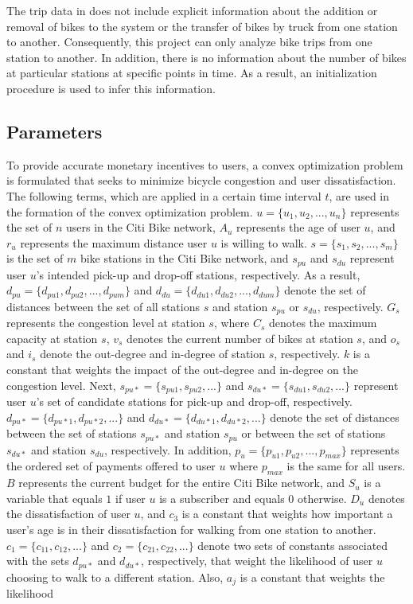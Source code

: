 \documentclass[times, 10pt,twocolumn]{article}
\begin{document}
The trip data in \cite{dataset} does not include explicit information about the addition or removal of bikes to the system or the transfer of bikes by truck from one station to another. Consequently, this project can only analyze bike trips from one station to another. In addition, there is no information about the number of bikes at particular stations at specific points in time. As a result, an initialization procedure is used to infer this information. 

\subsection{Parameters}

To provide accurate monetary incentives to users, a convex optimization problem is formulated that seeks to minimize bicycle congestion and user dissatisfaction. The following terms, which are applied in a certain time interval $t$, are used in the formation of the convex optimization problem. $u = \{u_1, u_2, ..., u_n\}$ represents the set of $n$ users in the Citi Bike network, $A_u$ represents the age of user $u$, and $r_u$ represents the maximum distance user $u$ is willing to walk. $s = \{s_1, s_2, ..., s_m\}$ is the set of $m$ bike stations in the Citi Bike network, and $s_{pu}$ and $s_{du}$ represent user $u$'s intended pick-up and drop-off stations, respectively. As a result, $d_{pu} = \{d_{pu1}, d_{pu2}, ..., d_{pum}\}$ and $d_{du} = \{d_{du1}, d_{du2}, ..., d_{dum}\}$ denote the set of distances between the set of all stations $s$ and station $s_{pu}$ or $s_{du}$, respectively. $G_s$ represents the congestion level at station $s$, where $C_s$ denotes the maximum capacity at station $s$, $v_s$ denotes the current number of bikes at station $s$, and $o_s$ and $i_s$ denote the out-degree and in-degree of station $s$, respectively. $k$ is a constant that weights the impact of the out-degree and in-degree on the congestion level. Next, $s_{pu*} = \{s_{pu1}, s_{pu2}, ...\}$ and $s_{du*} = \{s_{du1}, s_{du2}, ...\}$ represent user $u$'s set of candidate stations for pick-up and drop-off, respectively. $d_{pu*} = \{d_{pu*1}, d_{pu*2}, ...\}$ and $d_{du*} = \{d_{du*1}, d_{du*2}, ...\}$ denote the set of distances between the set of stations $s_{pu*}$ and station $s_{pu}$ or between the set of stations $s_{du*}$ and station $s_{du}$, respectively. In addition, $p_u = \{p_{u1}, p_{u2}, ..., p_{max}\}$ represents the ordered set of payments offered to user $u$ where $p_{max}$ is the same for all users. $B$ represents the current budget for the entire Citi Bike network, and $S_u$ is a variable that equals $1$ if user $u$ is a subscriber and equals $0$ otherwise. $D_u$ denotes the dissatisfaction of user $u$, and $c_3$ is a constant that weights how important a user's age is in their dissatisfaction for walking from one station to another. $c_1 = \{c_{11}, c_{12}, ...\}$ and $c_2 = \{c_{21}, c_{22}, ...\}$ denote two sets of constants associated with the sets $d_{pu*}$ and $d_{du*}$, respectively, that weight the likelihood of user $u$ choosing to walk to a different station. Also, $a_j$ is a constant that weights the likelihood 
\end{document}
